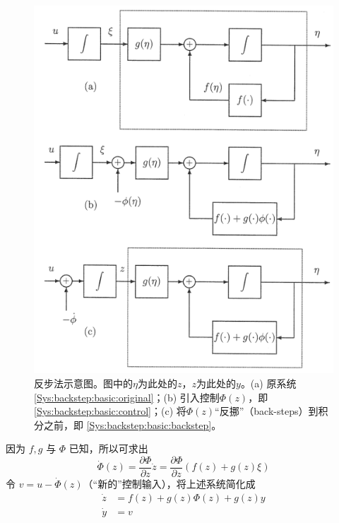 \begin{figure}[htbp]
    \centering
    \includegraphics[width=0.5\linewidth]{figure/adaptive/backstepping.png}
    \caption{反步法示意图。图中的$\eta$为此处的$z$，$z$为此处的$y$。(a) 原系统 \eqref{Sys:backstep:basic:original}；(b) 引入控制$\Phi(z)$，即 \eqref{Sys:backstep:basic:control}；(c) 将$\Phi(z)$“反挪”（back-steps）到积分之前，即 \eqref{Sys:backstep:basic:backstep}。}
    \label{fig:backstepping}
\end{figure}

因为 $f, g$ 与 $\Phi$ 已知，所以可求出
\[ \dot{\Phi} (z) = \frac{\partial \Phi}{\partial z} \dot{z} = \frac{\partial
   \Phi}{\partial z} (f (z) + g (z) \xi) \]
令 $v = u - \dot{\Phi} (z)$（“新的”控制输入），将上述系统简化成
\begin{align*}
  \dot{z} & = f (z) + g (z) \Phi (z) + g (z) y\\
  \dot{y} & = v
\end{align*}

